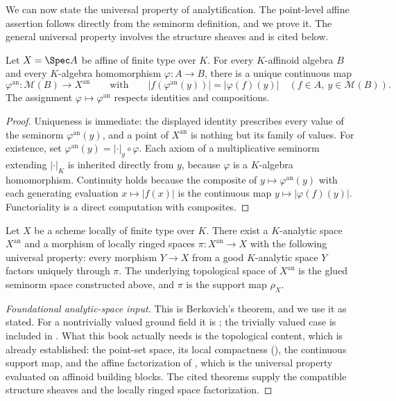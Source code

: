 We can now state the universal property of analytification. The point-level
affine assertion follows directly from the seminorm definition, and we
prove it. The general universal property involves the structure sheaves
and is cited below.

\begin{proposition}
\label{prop:berk-universal-affine}
Let $X=\Spec A$ be affine of finite type over $K$.  For every
$K$-affinoid algebra $B$ and every $K$-algebra homomorphism
$\varphi:A\to B$, there is a unique continuous map
\[
 \varphi^{\mathrm{an}}:\mathcal M(B)\longrightarrow X^{\mathrm{an}}
 \qquad\text{with}\qquad
 |f(\varphi^{\mathrm{an}}(y))|=|\varphi(f)(y)|
 \quad(f\in A,\ y\in\mathcal M(B)).
\]
The assignment $\varphi\mapsto\varphi^{\mathrm{an}}$ respects identities
and compositions.
\end{proposition}

\begin{proof}
Uniqueness is immediate: the displayed identity prescribes every value of
the seminorm $\varphi^{\mathrm{an}}(y)$, and a point of
$X^{\mathrm{an}}$ is nothing but its family of values.  For existence,
set $\varphi^{\mathrm{an}}(y)=|\cdot|_y\circ\varphi$.  Each axiom of a
multiplicative seminorm extending $|\cdot|_K$ is inherited directly
from $y$, because $\varphi$ is a $K$-algebra homomorphism.
Continuity holds because the composite of
$y\mapsto\varphi^{\mathrm{an}}(y)$ with each generating evaluation
$x\mapsto|f(x)|$ is the continuous map $y\mapsto|\varphi(f)(y)|$.
Functoriality is a direct computation with composites.
\end{proof}

\begin{theorem}
\label{thm:berk-universal-property}
Let $X$ be a scheme locally of finite type over $K$.  There exist a
$K$-analytic space $X^{\mathrm{an}}$ and a morphism of locally ringed
spaces $\pi:X^{\mathrm{an}}\to X$ with the following universal
property: every morphism $Y\to X$ from a good $K$-analytic space
$Y$ factors uniquely through $\pi$.  The underlying topological space
of $X^{\mathrm{an}}$ is the glued seminorm space constructed above, and
$\pi$ is the support map $\rho_X$.
\end{theorem}

\begin{proof}[Foundational analytic-space input]
This is Berkovich's theorem, and we use it as stated.  For a nontrivially
valued ground field it is \cite[Theorem~3.4.1]{Berk12}; the trivially
valued case is included in \cite[Theorem~3.5.1]{Berk12}.  What this book
actually needs is the topological content, which is already established:
the point-set space, its local compactness
(), the continuous support map, and
the affine factorization of , which is
the universal property evaluated on affinoid building blocks.  The cited
theorems supply the compatible structure sheaves and the locally ringed
space factorization.
\end{proof}

